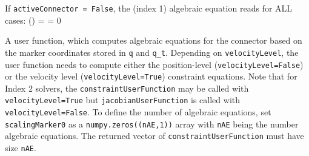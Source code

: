     If \texttt{activeConnector = False}, the (index 1) algebraic equation reads for ALL cases:
    \be
      \cv(\tlambda) = \tlambda = 0
    \ee

    
    A user function, which computes algebraic equations for the connector based on the marker coordinates stored in \texttt{q} and \texttt{q\_t}.
    Depending on \texttt{velocityLevel}, the user function needs to compute either the position-level (\texttt{velocityLevel=False}) or
    the velocity level (\texttt{velocityLevel=True}) constraint equations.
    Note that for Index 2 solvers, the \texttt{constraintUserFunction} may be called with \texttt{velocityLevel=True} but \texttt{jacobianUserFunction} 
    is called with \texttt{velocityLevel=False}.
    To define the number of algebraic equations, set \texttt{scalingMarker0} as a \texttt{numpy.zeros((nAE,1))} array with \texttt{nAE} being the number algebraic equations. 
    The returned vector of \texttt{constraintUserFunction} must have size \texttt{nAE}.
    
